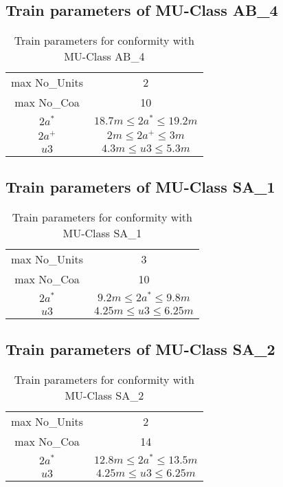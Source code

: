 \begin{appendices}
\subsection{Train parameters of MU-Class AB\_4}

\begin{table}[h]
    \centering
    \begin{tabular}{c|c}
    \hline
    max No\_Units & 2 \\
    max No\_Coa & 10 \\
    $2a^*$ & $ 18.7 m \leq 2a^* \leq 19.2 m $ \\
    $2a^+$ & $ 2 m \leq 2a^+ \leq 3m $ \\
    $u3$ & $4.3m \leq u3 \leq 5.3m $ \\
    \hline
    \end{tabular}
    \caption{Train parameters for conformity with MU-Class AB\_4}
    \label{tab:AB4}
\end{table}

\subsection{Train parameters of MU-Class SA\_1}

\begin{table}[h]
    \centering
    \begin{tabular}{c|c}
    \hline
    max No\_Units & 3 \\
    max No\_Coa & 10 \\
    $2a^*$ & $ 9.2 m \leq 2a^* \leq 9.8 m $ \\
    $u3$ & $4.25m \leq u3 \leq 6.25m $ \\
    \hline
    \end{tabular}
    \caption{Train parameters for conformity with MU-Class SA\_1}
    \label{tab:SA1}
\end{table}

\subsection{Train parameters of MU-Class SA\_2}

\begin{table}[h]
    \centering
    \begin{tabular}{c|c}
    \hline
    max No\_Units & 2 \\
    max No\_Coa & 14 \\
    $2a^*$ & $ 12.8 m \leq 2a^* \leq 13.5 m $ \\
    $u3$ & $4.25m \leq u3 \leq 6.25m $ \\
    \hline
    \end{tabular}
    \caption{Train parameters for conformity with MU-Class SA\_2}
    \label{tab:SA2}
\end{table}


\end{appendices}
